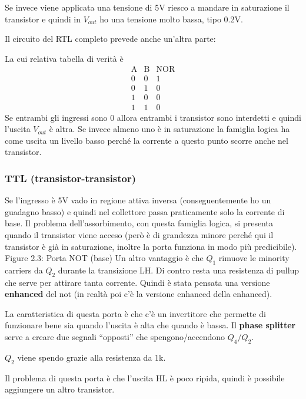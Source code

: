\documentclass[
]{article}
\begin{document}
Se invece viene applicata una tensione di 5V riesco a mandare in
saturazione il transistor e quindi in \(V_{out}\) ho una tensione molto
bassa, tipo 0.2V.

Il circuito del RTL completo prevede anche un'altra parte:

La cui relativa tabella di verità è \[
\begin{array}{cc|c}\text{A}&\text{B}&\text{NOR}\\\hline0&0&1\\0&1&0\\1&0&0\\1&1&0\end{array}
\] Se entrambi gli ingressi sono 0 allora entrambi i transistor sono
interdetti e quindi l'uscita \(V_{out}\) è altra. Se invece almeno uno è
in saturazione la famiglia logica ha come uscita un livello basso perché
la corrente a questo punto scorre anche nel transistor.

\subsubsection{TTL
(transistor-transistor)}\label{ttl-transistor-transistor}

Se l'ingresso è 5V vado in regione attiva inversa (conseguentemente ho
un guadagno basso) e quindi nel collettore passa praticamente solo la
corrente di base. Il problema dell'assorbimento, con questa famiglia
logica, si presenta quando il transistor viene acceso (però è di
grandezza minore perché qui il transistor è già in saturazione, inoltre
la porta funziona in modo più predicibile). Figure 2.3: Porta NOT (base)
Un altro vantaggio è che \(Q_{1}\) rimuove le minority carriers da
\(Q_{2}\) durante la transizione LH. Di contro resta una resistenza di
pullup che serve per attirare tanta corrente. \newline Quindi è stata
pensata una versione \textbf{enhanced} del not (in realtà poi c'è la
versione enhanced della enhanced).

La caratteristica di questa porta è che c'è un invertitore che permette
di funzionare bene sia quando l'uscita è alta che quando è bassa. Il
\textbf{phase splitter} serve a creare due segnali ``opposti'' che
spengono/accendono \(Q_{4}/Q_{2}\).

\(Q_{2}\) viene spendo grazie alla resistenza da 1k.

Il problema di questa porta è che l'uscita HL è poco ripida, quindi è
possibile aggiungere un altro transistor.
\end{document}
